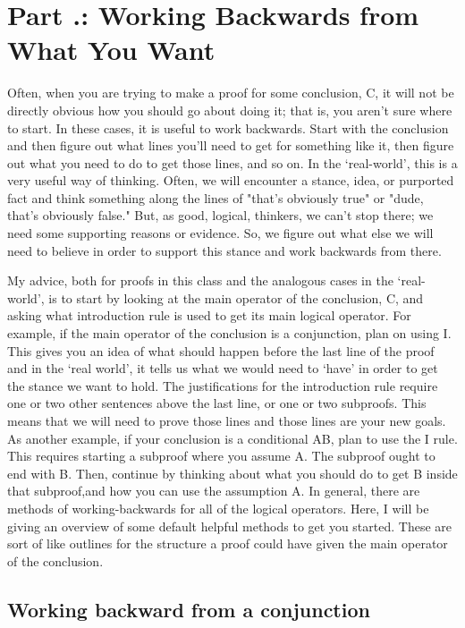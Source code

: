 \section{Part \thechapcount.\theseccount: Working Backwards from What You Want}
Often, when you are trying to make a proof for some conclusion, C, it will not be directly obvious how you should go about doing it; that is, you aren't sure where to start. In these cases, it is useful to work backwards. Start with the conclusion and then figure out what lines you'll need to get for something like it, then figure out what you need to do to get those lines, and so on. In the `real-world', this is a very useful way of thinking. Often, we will encounter a stance, idea, or purported fact and think something along the lines of "that's obviously true" or "dude, that's obviously false." But, as good, logical, thinkers, we can't stop there; we need some supporting reasons or evidence. So, we figure out what else we will need to believe in order to support this stance and work backwards from there.

My advice, both for proofs in this class and the analogous cases in the `real-world', is to start by looking at the main operator of the conclusion, C, and asking what introduction rule is used to get its main logical operator. For example, if the main operator of the conclusion is a conjunction, plan on using \eand I. This gives you an idea of what should happen before the last line of the proof and in the `real world', it tells us what we would need to `have' in order to get the stance we want to hold. The justifications for the introduction rule require one or two other sentences above the last line, or one or two subproofs. This means that we will need to prove those lines and those lines are your new goals. As another example, if your conclusion is a conditional A\eif B, plan to use the \eif I rule. This requires starting a subproof where you assume A. The subproof ought to end with B. Then, continue by thinking about what you should do to get B inside that subproof,and how you can use the assumption A. In general, there are methods of working-backwards for all of the logical operators. Here, I will be giving an overview of some default helpful methods to get you started. These are sort of like outlines for the structure a proof could have given the main operator of the conclusion.

\subsection{Working backward from a conjunction}

